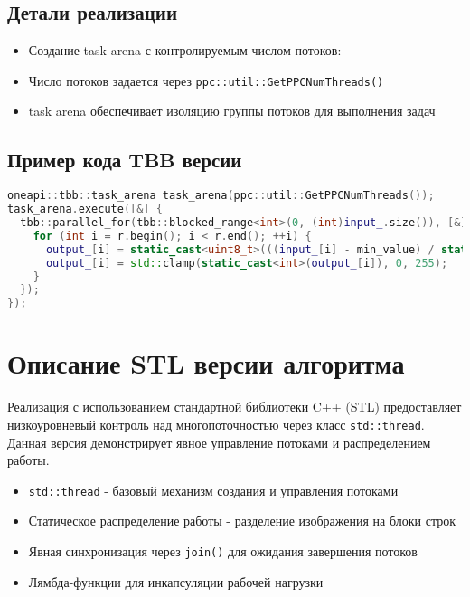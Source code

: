 \documentclass[14pt,a4paper]{extarticle}
\begin{document}
\subsection{Детали реализации}

\begin{itemize}
\item Создание task arena с контролируемым числом потоков:
\item Число потоков задается через \texttt{ppc::util::GetPPCNumThreads()}
\item task arena обеспечивает изоляцию группы потоков для выполнения задач
\end{itemize}

\subsection*{Пример кода TBB версии}
\begin{lstlisting}[language=C++]
oneapi::tbb::task_arena task_arena(ppc::util::GetPPCNumThreads());
task_arena.execute([&] {
  tbb::parallel_for(tbb::blocked_range<int>(0, (int)input_.size()), [&](const tbb::blocked_range<int>& r) {
    for (int i = r.begin(); i < r.end(); ++i) {
      output_[i] = static_cast<uint8_t>(((input_[i] - min_value) / static_cast<double>(max_value - min_value)) * 255.0);
      output_[i] = std::clamp(static_cast<int>(output_[i]), 0, 255);
    }
  });
});
\end{lstlisting}

\section{Описание STL версии алгоритма}

Реализация с использованием стандартной библиотеки C++ (STL) предоставляет низкоуровневый контроль над многопоточностью через класс \texttt{std::thread}. Данная версия демонстрирует явное управление потоками и распределением работы.

\begin{itemize}
\item \texttt{std::thread} - базовый механизм создания и управления потоками
\item Статическое распределение работы - разделение изображения на блоки строк
\item Явная синхронизация через \texttt{join()} для ожидания завершения потоков
\item Лямбда-функции для инкапсуляции рабочей нагрузки
\end{itemize}
\end{document}
